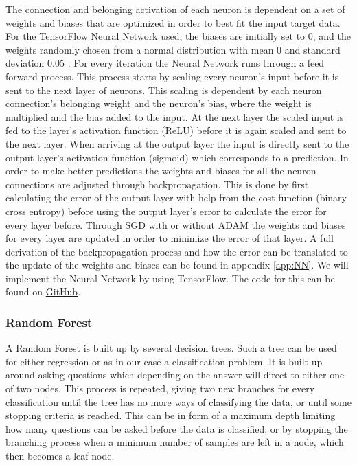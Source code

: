 \documentclass[11pt]{article}
\begin{document}
The connection and belonging activation of each neuron is dependent on a set of weights and biases that are optimized in order to best fit the input target data. For the TensorFlow Neural Network used, the biases are initially set to 0, and the weights randomly chosen from a normal distribution with mean 0 and standard deviation 0.05 \cite{tf}. For every iteration the Neural Network runs through a feed forward process. This process starts by scaling every neuron's input before it is sent to the next layer of neurons. This scaling is dependent by each neuron connection's belonging weight and the neuron's bias, where the weight is multiplied and the bias added to the input. At the next layer the scaled input is fed to the layer's activation function (ReLU) before it is again scaled and sent to the next layer. When arriving at the output layer the input is directly sent to the output layer's activation function (sigmoid) which corresponds to a prediction. In order to make better predictions the weights and biases for all the neuron connections are adjusted through backpropagation. This is done by first calculating the error of the output layer with help from the cost function (binary cross entropy) before using the output layer's error to calculate the error for every layer before.  Through SGD with or without ADAM the weights and biases for every layer are updated in order to minimize the error of that layer. A full derivation of the backpropagation process and how the error can be translated to the update of the weights and biases can be found in appendix \ref{app:NN}. We will implement the Neural Network by using TensorFlow. The code for this can be found on \href{https://github.com/Fslippe/FYS-STK4155/tree/main/project3}{GitHub}.
\subsubsection*{Random Forest}
A Random Forest is built up by several decision trees. Such a tree can be used for either regression or as in our case a classification problem. It is built up around asking questions which depending on the answer will direct to either one of two nodes. This process is repeated, giving two new branches for every classification until the tree has no more ways of classifying the data, or until some stopping criteria is reached. This can be in form of a maximum depth limiting how many questions can be asked before the data is classified, or by stopping the branching process when a minimum number of samples are left in a node, which then becomes a leaf node.
\end{document}
